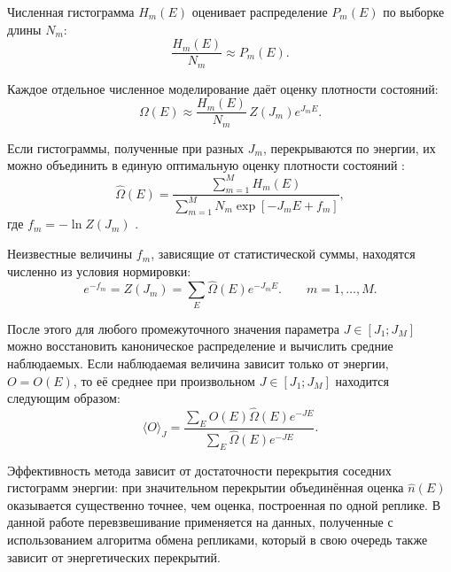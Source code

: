 Численная гистограмма $H_m(E)$ оценивает распределение $P_m(E)$ по выборке длины $N_m$:
 \begin{equation}
 	\frac{H_m(E)}{N_m}\approx P_m(E). 
 \end{equation}

Каждое отдельное численное  моделирование даёт оценку плотности состояний:
\begin{equation}
	\Omega(E)\approx \frac{H_m(E)}{N_m}\, Z(J_m)e^{J_m E}.
	\label{eq:single_hist_dos}
\end{equation}

Если гистограммы, полученные при разных $J_m$, перекрываются по энергии, их можно объединить в единую оптимальную оценку плотности состояний \cite{PhysRevLett.63.1195}:
\begin{equation}
	\hat \Omega(E)=
	\frac{\sum\limits_{m=1}^{M} H_m(E)}
	{\sum\limits_{m=1}^{M} N_m \exp\!\left[-J_m E+f_m\right]},
	\label{eq:fs_dos}
\end{equation}
где $
	f_m=-\ln Z(J_m)$ .
 

Неизвестные величины $f_m$, зависящие от статистической суммы, находятся численно из условия нормировки:
\begin{equation}
	e^{-f_m}=Z(J_m)=\sum_E \hat  \Omega(E)e^{-J_m E}.
	\qquad m=1,\dots,M.
	\label{eq:fs_selfconsistent}
\end{equation}

После этого для любого промежуточного значения параметра $J \in [  J_1 ; J_M ]$ можно восстановить каноническое распределение и вычислить средние наблюдаемых. Если наблюдаемая величина зависит только от энергии, $O=O(E)$, то её среднее при произвольном $J \in [  J_1 ; J_M ] $  находится следующим образом: 
\begin{equation}
	\langle O \rangle_J =
	\frac{\sum_E O(E)\hat  \Omega(E)e^{-J E}}
	{\sum_E \hat  \Omega(E)e^{-J E}}.
	\label{eq:obs_from_dos}
\end{equation}



Эффективность метода зависит от достаточности перекрытия соседних   гистограмм энергии: при значительном перекрытии объединённая оценка $\hat n(E)$ оказывается существенно точнее, чем оценка, построенная по одной реплике. В данной работе перевзвешивание применяется на данных, полученные с использованием алгоритма обмена репликами, который в свою очередь также зависит от энергетических перекрытий.


